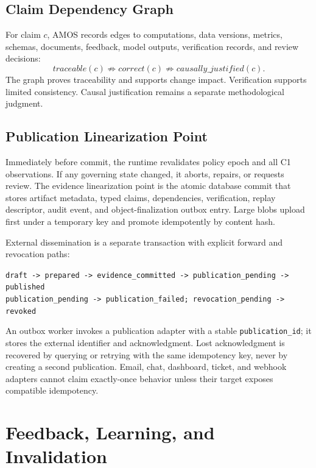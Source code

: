 \documentclass[10pt]{article}
\newcommand{\amos}{\textsc{AMOS}\xspace}
\newcommand{\idcode}[1]{\nolinkurl{#1}}
\begin{document}
\subsection{Claim Dependency Graph}

For claim $c$, \amos records edges to computations, data versions, metrics, schemas, documents, feedback, model outputs, verification records, and review decisions:
\begin{equation}
  traceable(c) \not\Rightarrow correct(c) \not\Rightarrow causally\_justified(c).
\end{equation}
The graph proves traceability and supports change impact. Verification supports limited consistency. Causal justification remains a separate methodological judgment.

\subsection{Publication Linearization Point}

Immediately before commit, the runtime revalidates policy epoch and all C1 observations. If any governing state changed, it aborts, repairs, or requests review. The evidence linearization point is the atomic database commit that stores artifact metadata, typed claims, dependencies, verification, replay descriptor, audit event, and object-finalization outbox entry. Large blobs upload first under a temporary key and promote idempotently by content hash.

External dissemination is a separate transaction with explicit forward and revocation paths:
\begin{center}
\scriptsize
\texttt{draft -> prepared -> evidence\_committed -> publication\_pending -> published}\\
\texttt{publication\_pending -> publication\_failed; revocation\_pending -> revoked}
\end{center}
An outbox worker invokes a publication adapter with a stable \idcode{publication_id}; it stores the external identifier and acknowledgment. Lost acknowledgment is recovered by querying or retrying with the same idempotency key, never by creating a second publication. Email, chat, dashboard, ticket, and webhook adapters cannot claim exactly-once behavior unless their target exposes compatible idempotency.

\section{Feedback, Learning, and Invalidation}
\end{document}
